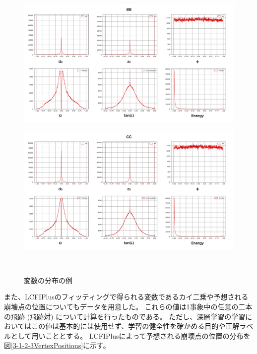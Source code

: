 \begin{figure}[htbp]
  \begin{minipage}{1.0\textwidth}
  \centering
   \begin{minipage}{0.48\textwidth}
   \centering
    \includegraphics[width=1.0\textwidth, clip]{Figure/3Networks/3-1-2-2ReshapedVariablesBB.png}
    \label{3-1-2-2ReshapedVariablesBB}
   \end{minipage}
   \begin{minipage}{0.48\textwidth}
   \centering
    \includegraphics[width=1.0\textwidth, clip]{Figure/3Networks/3-1-2-2ReshapedVariablesCC.png}
    \label{3-1-2-2ReshapedVariablesCC}
   \end{minipage}
   \end{minipage}
  \caption{変数の分布の例}
  \label{3-1-2-2Variables}
\end{figure}

また、LCFIPlusのフィッティングで得られる変数であるカイ二乗や予想される崩壊点の位置についてもデータを用意した。
これらの値は1事象中の任意の二本の飛跡 (飛跡対) について計算を行ったものである。
ただし、深層学習の学習においてはこの値は基本的には使用せず、学習の健全性を確かめる目的や正解ラベルとして用いこととする。
LCFIPlusによって予想される崩壊点の位置の分布を図\ref{3-1-2-3VertexPositions}に示す。


